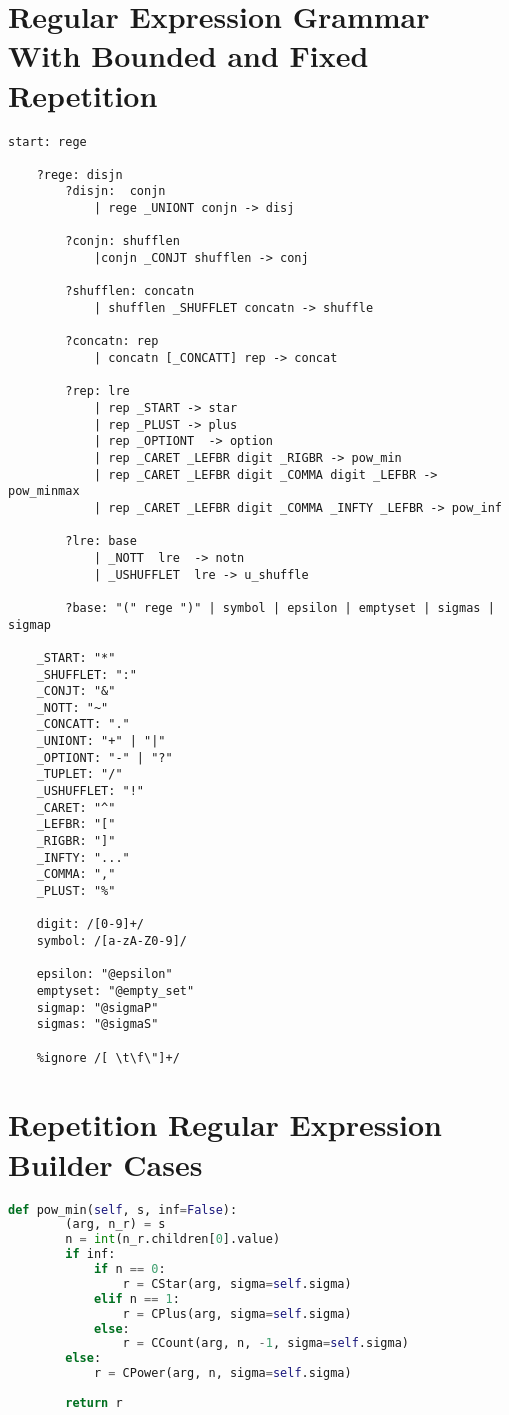 \appendix
\chapter{Regular Expression Grammar With Bounded and Fixed Repetition}
\label{appendix:regexp_lark}
\begin{lstlisting}[caption={Lark grammar for regular expression parsing (with bounded/fixed repetition support)}]
	start: rege

	?rege: disjn
		?disjn:  conjn
			| rege _UNIONT conjn -> disj

		?conjn: shufflen
			|conjn _CONJT shufflen -> conj

		?shufflen: concatn
			| shufflen _SHUFFLET concatn -> shuffle

		?concatn: rep
			| concatn [_CONCATT] rep -> concat

		?rep: lre
			| rep _START -> star
			| rep _PLUST -> plus
			| rep _OPTIONT  -> option
			| rep _CARET _LEFBR digit _RIGBR -> pow_min
			| rep _CARET _LEFBR digit _COMMA digit _LEFBR -> pow_minmax
			| rep _CARET _LEFBR digit _COMMA _INFTY _LEFBR -> pow_inf

		?lre: base
			| _NOTT  lre  -> notn
			| _USHUFFLET  lre -> u_shuffle

		?base: "(" rege ")" | symbol | epsilon | emptyset | sigmas | sigmap

	_START: "*"
	_SHUFFLET: ":"
	_CONJT: "&"
	_NOTT: "~"
	_CONCATT: "."
	_UNIONT: "+" | "|"
	_OPTIONT: "-" | "?"
	_TUPLET: "/"
	_USHUFFLET: "!"
	_CARET: "^"
	_LEFBR: "["
	_RIGBR: "]"
	_INFTY: "..."
	_COMMA: ","
	_PLUST: "%"

	digit: /[0-9]+/
	symbol: /[a-zA-Z0-9]/

	epsilon: "@epsilon"
	emptyset: "@empty_set"
	sigmap: "@sigmaP"
	sigmas: "@sigmaS"

	%ignore /[ \t\f\"]+/
\end{lstlisting}

\chapter{Repetition Regular Expression Builder Cases}
\label{appendix:regexp_builders}
\begin{lstlisting}[language=Python, caption={pow\_min: Fixed/Lower-bound-infinite Repetition Case}]
	def pow_min(self, s, inf=False):
		(arg, n_r) = s
		n = int(n_r.children[0].value)
		if inf:
			if n == 0:
				r = CStar(arg, sigma=self.sigma)
			elif n == 1:
				r = CPlus(arg, sigma=self.sigma)
			else:
				r = CCount(arg, n, -1, sigma=self.sigma)
		else:
			r = CPower(arg, n, sigma=self.sigma)
		
		return r
\end{lstlisting}

